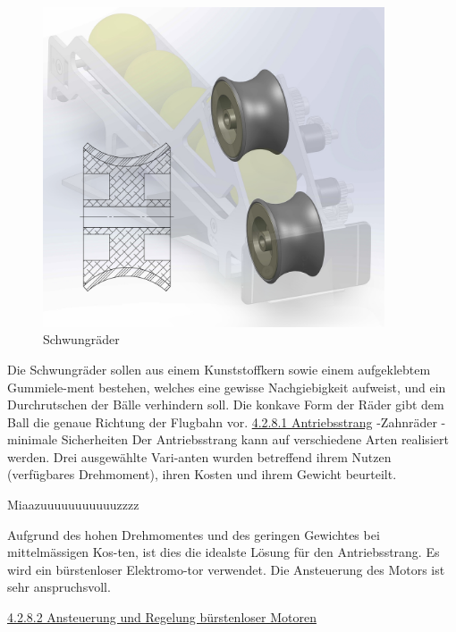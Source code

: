 \begin{figure}
	\centering
	\includegraphics[width=0.9\textwidth]{Enddokumentation/Loesungskonzept/Bilder/Schwungraeder.jpg}
	\caption{Schwungräder}
	\label{fig:Schwungräder}	
\end{figure}
Die Schwungräder sollen aus einem Kunststoffkern sowie einem aufgeklebtem Gummiele-ment bestehen, welches eine gewisse Nachgiebigkeit aufweist, und ein Durchrutschen der Bälle verhindern soll.  Die konkave Form der Räder gibt dem Ball die genaue Richtung der Flugbahn vor.
\underline{4.2.8.1	Antriebsstrang}
-Zahnräder
-minimale Sicherheiten
Der Antriebsstrang kann auf verschiedene Arten realisiert werden. Drei ausgewählte Vari-anten wurden betreffend ihrem Nutzen (verfügbares Drehmoment), ihren Kosten und ihrem Gewicht beurteilt.
\begin{table}
	\centering
	\label{tab:Antriebsstrang}
	Miaazuuuuuuuuuuuzzzz
\end{table}

Aufgrund des hohen Drehmomentes und des geringen Gewichtes bei mittelmässigen Kos-ten, ist dies die idealste Lösung für den Antriebsstrang. Es wird ein bürstenloser Elektromo-tor verwendet. Die Ansteuerung des Motors ist sehr anspruchsvoll.

\underline{4.2.8.2	Ansteuerung und Regelung bürstenloser Motoren}
